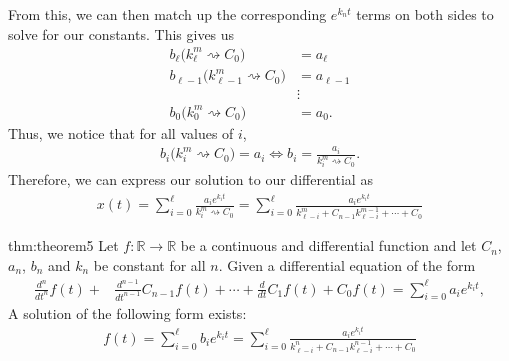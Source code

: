 From this, we can then match up the corresponding $e^{k_nt}$ terms on both sides to solve for our constants. This gives us
\begin{align}
b_{\ell}\big( k_{\ell}^m\rightsquigarrow C_0\big) &= a_\ell \\
b_{\ell-1}\big( k_{\ell-1}^m \rightsquigarrow C_0\big) &= a_{\ell-1} \\
&\vdots \\
b_{0}\big( k_{0}^m \rightsquigarrow C_0\big) &= a_0.
\end{align}
Thus, we notice that for all values of $i$,
\begin{align}
b_{i}\big( k_{i}^m \rightsquigarrow C_0\big) = a_i \Longleftrightarrow b_{i}=\frac{a_i}{k_{i}^m \rightsquigarrow C_0} .
\end{align}
Therefore, we can express our solution to our differential as
\begin{align}
x(t)=\sum_{i=0}^{\ell}\frac{a_ie^{k_it}}{k_{i}^m \rightsquigarrow C_0} = \sum_{i=0}^{\ell}\frac{a_ie^{k_it}}{k_{\ell-i}^m +C_{n-1} k_{\ell-i}^{m-1} +\cdots+C_0} 
\end{align}








\begin{theo}{thm:theorem5}
Let $f:\mathbb{R}\rightarrow\mathbb{R}$ be a continuous and differential function and let $C_n$, $a_n$, $b_n$ and $k_n$ be constant for all $n$. Given a differential equation of the form
\begin{align*}
\frac{d^n}{dt^n}f(t)+&\frac{d^{n-1}}{dt^{n-1}}C_{n-1}f(t)+\cdots+\frac{d}{dt}C_1f(t)+C_0f(t)=\sum_{i=0}^{\ell}a_i e^{k_i t},
\end{align*}
A solution of the following form exists:
\begin{align*}
f(t)=\sum_{i=0}^{\ell}b_i e^{k_i t}=\sum_{i=0}^{\ell}\frac{a_ie^{k_it}}{k_{\ell-i}^n +C_{n-1} k_{\ell-i}^{n-1} +\cdots+C_0} 
\end{align*}
\end{theo}

